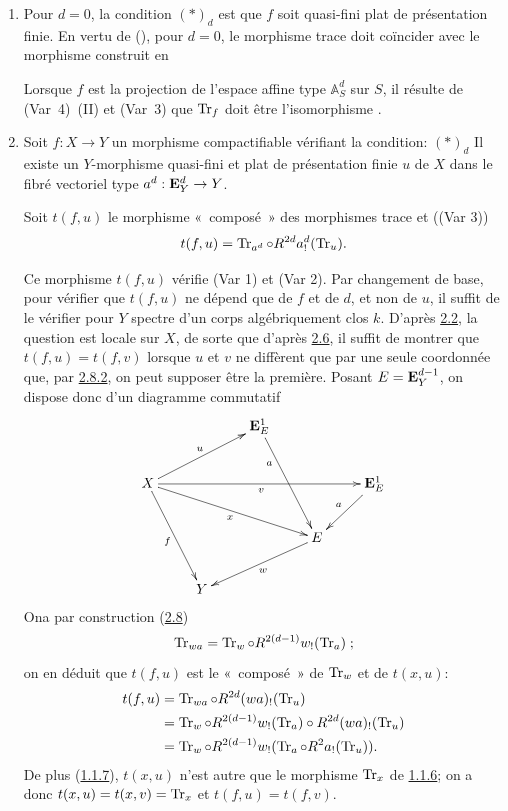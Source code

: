 \documentclass[10pt]{../fichiers-configuration-latex/smfart}
\begin{document}
\begin{enumerate}
\renewcommand{\theenumi}{\alph{enumi}}
\renewcommand{\labelenumi}{\theenumi)}
\item Pour $d=0$, la condition $(\ast)_{d}$ est que $f$ soit
quasi-fini plat de présentation finie. En vertu de (), pour
$d=0$, le morphisme trace doit coïncider avec le morphisme construit
en \loccit

Lorsque $f$ est la projection de l'espace affine type
$\mathbb A^{d}_{S}$ sur $S$, il résulte de (Var~4)~(II) et (Var~3) que
$\operatorname{Tr}_{f}$ doit être l'isomorphisme .

\item Soit $f:X\rightarrow Y$ un morphisme compactifiable vérifiant la
condition: $(\ast)_{d}$ Il existe un $Y$-morphisme quasi-fini et plat
de présentation finie $u$ de $X$ dans le fibré vectoriel type
$a^{d}:\mathbf{E}^{d}_{Y}\rightarrow Y$.

Soit $t(f,u)$ le morphisme « composé »  des morphismes trace
 et \SGA {} (\cf (Var 3))
$$
t(f,u)=\operatorname{Tr}_{a^d}\circ R^{2d}a^{d}_{!}(\operatorname{Tr}_{u}){}.
$$

Ce morphisme $t(f,u)$ vérifie (Var 1) et (Var 2). Par changement de
base, pour vérifier que $t(f,u)$ ne dépend que de $f$ et de $d$, et
non de $u$, il suffit de le vérifier pour $Y$ spectre d'un corps
algébriquement clos $k$. D'après \hyperref[XVIII.lem2.2]{2.2}, la question est
locale sur $X$, 
de sorte que d'après \hyperref[XVIII.lem2.6]{2.6}, il suffit de montrer que
$t(f,u)=t(f,v)$ 
lorsque $u$ et $v$ ne diffèrent que par une seule coordonnée que, par
\hyperref[XVIII.subsubsec2.8.2]{2.8.2}, on peut supposer être la première. Posant
$E=\mathbf{E}^{d-1}_{Y}$, on dispose donc d'un diagramme commutatif
$$
\xymatrix{
                              &    &\EE^1_{E} \ar[rdd]_(.3){a} &  &  \\
X \ar[rrrr]_{v}\ar[rru]^{u} \ar[rdd]_{f} \ar[rrrd]_{x}&    &                 &
                              &\EE^{1}_E \ar[ld]_{a}\\
                              &    &                 &E \ar[lld]^w& \\
                              & Y  &                 &  &
}
$$
On\pageoriginale a par construction (\hyperref[XVIII.subsec2.8]{2.8})
$$
\operatorname{Tr}_{wa}=\operatorname{Tr}_{w}\circ R^{2(d-1)}w_!(\operatorname{Tr}_{a}){}\;;
$$
on en déduit que $t(f,u)$ est le « composé »  de $\operatorname{Tr}_{w}$ et de
$t(x,u)$:
\begin{align*}
t(f,u) &= \operatorname{Tr}_{wa}\circ R^{2d}(wa)_{!}(\operatorname{Tr}_{u})\\
       &= \operatorname{Tr}_{w}\circ R^{2(d-1)}w_{!}(\operatorname{Tr}_{a})\circ
       R^{2d}(wa)_{!}(\operatorname{Tr}_{u})\\
       &= \operatorname{Tr}_{w}\circ R^{2(d-1)}w_{!}(\operatorname{Tr}_{a}\circ
       R^{2}a_{!}(\operatorname{Tr}_{u})){}.
\end{align*}
De plus (\hyperref[XVIII.lem1.1.7]{1.1.7}), $t(x,u)$ n'est autre que le morphisme
$\operatorname{Tr}_{x}$ de \hyperref[XVIII.prop1.1.6]{1.1.6}; on a donc $t(x,u)=t(x,v)=\operatorname{Tr}_{x}$
et $t(f,u)=t(f,v)$. 


\end{enumerate}
\end{document}
